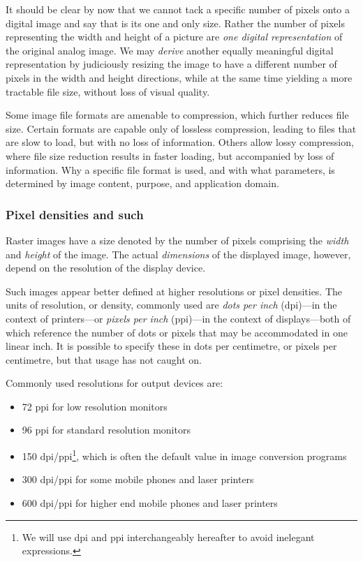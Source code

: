 \documentclass[
  11pt,
  british,
  a4paper,
]{article}
\providecommand{\tightlist}{%
  \setlength{\itemsep}{0pt}\setlength{\parskip}{0pt}}
\begin{document}
It should be clear by now that we cannot tack a specific number of
pixels onto a digital image and say that is its one and only size.
Rather the number of pixels representing the width and height of a
picture are \emph{one digital representation} of the original analog
image. We may \emph{derive} another equally meaningful digital
representation by judiciously resizing the image to have a different
number of pixels in the width and height directions, while at the same
time yielding a more tractable file size, without loss of visual
quality.

Some image file formats are amenable to compression, which further
reduces file size. Certain formats are capable only of lossless
compression, leading to files that are slow to load, but with no loss of
information. Others allow lossy compression, where file size reduction
results in faster loading, but accompanied by loss of information. Why a
specific file format is used, and with what parameters, is determined by
image content, purpose, and application domain.

\hypertarget{pixel-densities-and-such}{%
\subsubsection{Pixel densities and
such}\label{pixel-densities-and-such}}

Raster images have a size denoted by the number of pixels comprising the
\emph{width} and \emph{height} of the image. The actual
\emph{dimensions} of the displayed image, however, depend on the
resolution of the display device.

Such images appear better defined at higher resolutions or pixel
densities. The units of resolution, or density, commonly used are
\emph{dots per inch} (dpi)---in the context of printers---or
\emph{pixels per inch} (ppi)---in the context of displays---both of
which reference the number of dots or pixels that may be accommodated in
one linear inch. It is possible to specify these in dots per centimetre,
or pixels per centimetre, but that usage has not caught on.

Commonly used resolutions for output devices are:

\begin{itemize}
\tightlist
\item
  72 ppi for low resolution monitors
\item
  96 ppi for standard resolution monitors
\item
  150 dpi/ppi\footnote{We will use dpi and ppi interchangeably hereafter
    to avoid inelegant expressions.}, which is often the default value
  in image conversion programs
\item
  300 dpi/ppi for some mobile phones and laser printers
\item
  600 dpi/ppi for higher end mobile phones and laser printers
\end{itemize}
\end{document}
